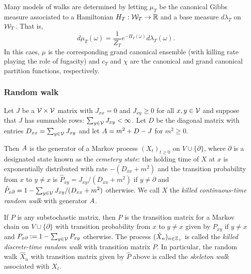 Many models of walks are determined by letting $\mu_T$ be the canonical Gibbs measure
associated to a Hamiltonian $H_T : \mathcal{W}_T \rightarrow {\mathbb R}$ and a base measure $d\lambda_T$ on $\mathcal{W}_T$.
That is,
\begin{equation}
d\mu_T(\omega) = \frac{1}{Z_T} e^{-H_T(\omega)} d\lambda_T(\omega).
\end{equation}
In this caes, $\mu$ is the corresponding grand canonical ensemble (with killing rate playing
the role of fugacity) and $c_T$ and $\chi$
are the canonical and grand canonical partition functions, respectively.



\subsubsection{Random walk}

Let $J$ be a $\mathcal{V} \times \mathcal{V}$
matrix with $J_{xx} = 0$ and $J_{xy} \ge 0$ for all $x, y \in \mathcal{V}$ and suppose
that $J$ has summable rows: $\sum_{y\in\mathcal{V}} J_{xy} < \infty$. Let $D$ be
the diagonal matrix with entries $D_{xx} = \sum_{y\in\mathcal{V}} J_{xy}$
and let $A = m^2 + D - J$ for $m^2 \ge 0$.

Then $A$ is the generator of a Markov process $(X_t)_{t \ge 0}$ on
$V \cup \{ \partial \}$, where $\partial$ is a designated state known as the
\emph{cemetery state}:
the holding time of $X$ at $x$ is exponentially distributed with rate $-(D_{xx} + m^2)$
and the transition probability from $x$ to $y \ne x$ is
$\hat P_{xy} = J_{xy} / (D_{xx} + m^2)$ if $y \ne \partial$
and $\hat P_{x\partial} = 1 - \sum_{y\in\mathcal{V}} J_{xy} / (D_{xx} + m^2)$
otherwise.
We call $X$ the \emph{killed continuous-time random walk} with generator $A$.

If $P$ is any substochastic matrix, then $P$ is the transition matrix for a Markov chain
on $V \cup \{\partial\}$ with transition probability from $x$ to $y \ne x$ given by $P_{xy}$
if $y \ne x$ and $P_{x\partial} := 1 - \sum_{y\in\mathcal{V}} P_{xy}$ otherwise.
The process
$(\hat X_n)_{n\in{\mathbb Z}_+}$ is called the \emph{killed discrete-time random walk} with transition matrix $P$.
In particular, the random walk $\hat X_n$ with transition matrix given by $\hat P$ above
is called the \emph{skeleton walk} associated with $X_t$.

